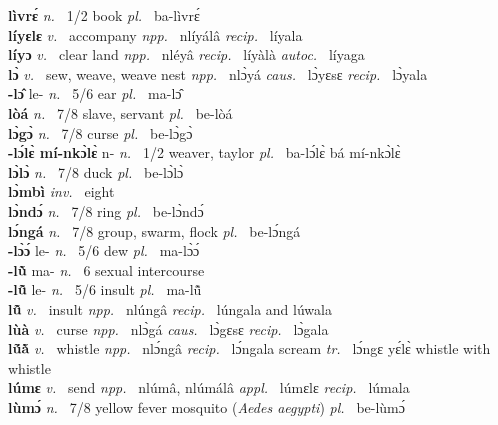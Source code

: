 {\bfseries lìvrɛ́}  {\itshape n.~} 1/2 book {\itshape pl.~} ba-lìvrɛ́    \\ 
{\bfseries líyɛlɛ}  {\itshape v.~} accompany   {\itshape npp.~} nlíyálâ {\itshape recip.~} líyala  \\ 
{\bfseries líyɔ}  {\itshape v.~} clear land   {\itshape npp.~} nléyâ {\itshape recip.~} líyàlà {\itshape autoc.~} líyaga  \\ 
{\bfseries lɔ̀}  {\itshape v.~} sew, weave, weave nest   {\itshape npp.~} nlɔ̀yá {\itshape caus.~} lɔ̀yɛsɛ {\itshape recip.~} lɔ̀yala  \\ 
{\bfseries -lɔ̂} le- {\itshape n.~} 5/6 ear {\itshape pl.~} ma-lɔ̂    \\ 
{\bfseries lòá}  {\itshape n.~} 7/8 slave, servant {\itshape pl.~} be-lòá    \\ 
{\bfseries lɔ̀gɔ̀}  {\itshape n.~} 7/8 curse {\itshape pl.~} be-lɔ̀gɔ̀    \\ 
{\bfseries -lɔ́lɛ̀ mí-nkɔ̀lɛ̀} n- {\itshape n.~} 1/2 weaver, taylor {\itshape pl.~} ba-lɔ́lɛ̀ bá mí-nkɔ̀lɛ̀    \\ 
{\bfseries lɔ̀lɔ̀}  {\itshape n.~} 7/8 duck {\itshape pl.~} be-lɔ̀lɔ̀    \\ 
{\bfseries lɔ̀mbì}  {\itshape inv.~} eight    \\ 
{\bfseries lɔ̀ndɔ́}  {\itshape n.~} 7/8 ring {\itshape pl.~} be-lɔ̀ndɔ́    \\ 
{\bfseries lɔ́ngá}  {\itshape n.~} 7/8 group, swarm, flock {\itshape pl.~} be-lɔ́ngá    \\ 
{\bfseries -lɔ̀ɔ́} le- {\itshape n.~} 5/6 dew {\itshape pl.~} ma-lɔ̀ɔ́    \\ 
{\bfseries -lũ̀} ma- {\itshape n.~} 6 sexual intercourse    \\ 
{\bfseries -lũ̂} le- {\itshape n.~} 5/6 insult {\itshape pl.~} ma-lũ̂    \\ 
{\bfseries lũ̂}  {\itshape v.~} insult   {\itshape npp.~} nlúngâ {\itshape recip.~} lúngala and lúwala\\ 
{\bfseries lùà}  {\itshape v.~} curse   {\itshape npp.~} nlɔ̀gá {\itshape caus.~} lɔ̀gɛsɛ {\itshape recip.~} lɔ̀gala  \\ 
{\bfseries lṹã̀}  {\itshape v.~} whistle   {\itshape npp.~} nlɔ́ngâ {\itshape recip.~} lɔ́ngala scream {\itshape tr.~} lɔ́ngɛ yɛ́lɛ̀ whistle with whistle  \\ 
{\bfseries lúmɛ}  {\itshape v.~} send   {\itshape npp.~} nlúmâ, nlúmálâ {\itshape appl.~} lúmɛlɛ {\itshape recip.~} lúmala  \\ 
{\bfseries lùmɔ́}  {\itshape n.~} 7/8 yellow fever mosquito ({\itshape Aedes aegypti}) {\itshape pl.~} be-lùmɔ́    \\ 
